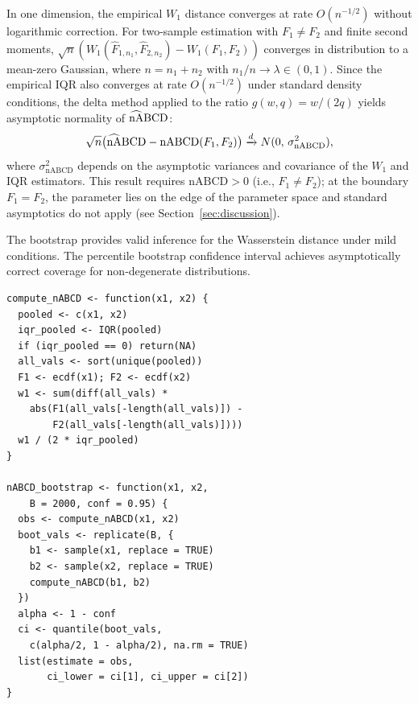 \documentclass[AMA,Times1COL]{WileyNJDv5}
\newcommand{\hnABCD}{\mathrlap{\widehat{\phantom{\text{nA}}}}\text{nABCD}}
\begin{document}
In one dimension, the empirical $W_1$ distance converges at rate $O(n^{-1/2})$ without logarithmic correction.\cite{delbarrio1999} For two-sample estimation with $F_1 \neq F_2$ and finite second moments, $\sqrt{n}(W_1(\hat{F}_{1,n_1}, \hat{F}_{2,n_2}) - W_1(F_1, F_2))$ converges in distribution to a mean-zero Gaussian, where $n = n_1 + n_2$ with $n_1/n \to \lambda \in (0,1)$. Since the empirical IQR also converges at rate $O(n^{-1/2})$ under standard density conditions, the delta method applied to the ratio $g(w, q) = w/(2q)$ yields asymptotic normality of $\hnABCD$:
\begin{equation}
\sqrt{n}\bigl(\hnABCD - \text{nABCD}(F_1, F_2)\bigr) \xrightarrow{d} N(0,\, \sigma^2_{\text{nABCD}}),
\label{eq:asymptotic_normality}
\end{equation}
where $\sigma^2_{\text{nABCD}}$ depends on the asymptotic variances and covariance of the $W_1$ and IQR estimators. This result requires $\text{nABCD} > 0$ (i.e., $F_1 \neq F_2$); at the boundary $F_1 = F_2$, the parameter lies on the edge of the parameter space and standard asymptotics do not apply (see Section~\ref{sec:discussion}).

The bootstrap provides valid inference for the Wasserstein distance under mild conditions.\cite{sommerfeld2018} The percentile bootstrap confidence interval achieves asymptotically correct coverage for non-degenerate distributions.


\begin{lstlisting}[caption={R function for computing nABCD with bootstrap confidence intervals.},label=lst:nabcd,basicstyle=\fontsize{8}{10}\selectfont\ttfamily]
compute_nABCD <- function(x1, x2) {
  pooled <- c(x1, x2)
  iqr_pooled <- IQR(pooled)
  if (iqr_pooled == 0) return(NA)
  all_vals <- sort(unique(pooled))
  F1 <- ecdf(x1); F2 <- ecdf(x2)
  w1 <- sum(diff(all_vals) *
    abs(F1(all_vals[-length(all_vals)]) -
        F2(all_vals[-length(all_vals)])))
  w1 / (2 * iqr_pooled)
}

nABCD_bootstrap <- function(x1, x2,
    B = 2000, conf = 0.95) {
  obs <- compute_nABCD(x1, x2)
  boot_vals <- replicate(B, {
    b1 <- sample(x1, replace = TRUE)
    b2 <- sample(x2, replace = TRUE)
    compute_nABCD(b1, b2)
  })
  alpha <- 1 - conf
  ci <- quantile(boot_vals,
    c(alpha/2, 1 - alpha/2), na.rm = TRUE)
  list(estimate = obs,
       ci_lower = ci[1], ci_upper = ci[2])
}
\end{lstlisting}
\end{document}
